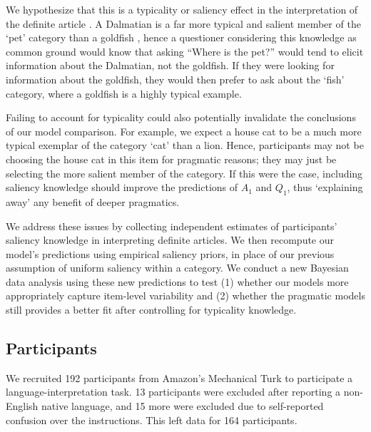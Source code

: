 \documentclass[12pt, floatsintext, jou]{apa6}
\begin{document}

We hypothesize that this is a typicality or saliency effect in the interpretation of the definite article \cite{Strawson50_OnReferring, clark1983common}. A Dalmatian is a far more typical and salient member of the `pet' category than a goldfish \cite{Rosch75}, hence a questioner considering this knowledge as common ground would know that asking ``Where is the pet?'' would tend to elicit information about the Dalmatian, not the goldfish. If they were looking for information about the goldfish, they would then prefer to ask about the `fish' category, where a goldfish is a highly typical example. 

Failing to account for typicality could also potentially invalidate the conclusions of our model comparison. For example, we expect a house cat to be a much more typical exemplar of the category `cat' than a lion. Hence, participants may not be choosing the house cat in this item for pragmatic reasons; they may just be selecting the more salient member of the category. If this were the case, including saliency knowledge should improve the predictions of $A_1$ and $Q_1$, thus `explaining away' any benefit of deeper pragmatics. 


We address these issues by collecting independent estimates of participants' saliency knowledge in interpreting definite articles. We then recompute our model's predictions using empirical saliency priors, in place of our previous assumption of uniform saliency within a category. We conduct a new Bayesian data analysis using these new predictions to test (1) whether our models more appropriately capture item-level variability and (2) whether the pragmatic models still provides a better fit after controlling for typicality knowledge.

\subsection{Participants} 
We recruited 192 participants from Amazon's Mechanical Turk to participate a language-interpretation task. 13 participants were excluded after reporting a non-English native language, and 15 more were excluded due to self-reported confusion over the instructions. This left data for 164 participants.
\end{document}
